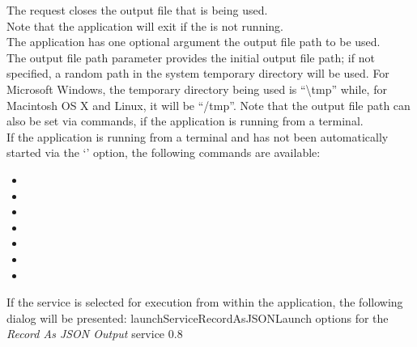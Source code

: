 The  request closes the output
file that is being used.\\

Note that the application will exit if the  is not
running.\\

The application has one optional argument \longDash{} the output file path to be used.
\insertAppParameters
{}
\insertOutputServiceComment\\

The output file path parameter provides the initial output file path; if not specified, a
random path in the system temporary directory will be used.
For Microsoft Windows, the temporary directory being used is ``\textbackslash{}tmp''
while, for Macintosh OS X and Linux, it will be ``/tmp''.
Note that the output file path can also be set via commands, if the application is
running from a terminal.\\

If the application is running from a terminal and has not been automatically started via
the `' option, the following commands are available:
\begin{itemize}
\item{}
\item\exSp{}
\item\exSp{}
\item\exSp{}
\item\exSp{}
\item\exSp{}
\item\exSp{}
\end{itemize}
\condPage
If the service is selected for execution from within the \emph{\CMU} application, the
following dialog will be presented:
%
{launchServiceRecordAsJSON}{Launch options for the \emph{Record As JSON Output} service}%
{0.8}

